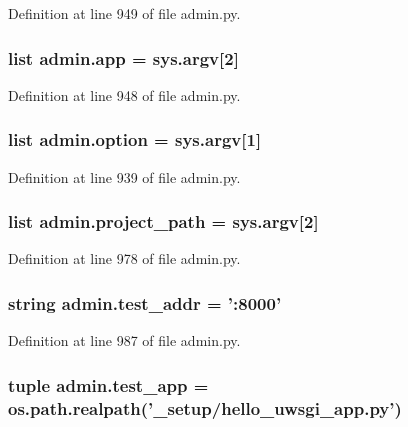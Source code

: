 Definition at line 949 of file admin.\-py.

\hypertarget{namespaceadmin_a88f927a5e67d8ccf759fd256f58a9411}{
\subsubsection[{app}]{\setlength{\rightskip}{0pt plus 5cm}list admin.\-app = sys.\-argv\mbox{[}2\mbox{]}}}\label{namespaceadmin_a88f927a5e67d8ccf759fd256f58a9411}


Definition at line 948 of file admin.\-py.

\hypertarget{namespaceadmin_a5ed72260a120fc91cfd491f424eeb883}{
\subsubsection[{option}]{\setlength{\rightskip}{0pt plus 5cm}list admin.\-option = sys.\-argv\mbox{[}1\mbox{]}}}\label{namespaceadmin_a5ed72260a120fc91cfd491f424eeb883}


Definition at line 939 of file admin.\-py.

\hypertarget{namespaceadmin_a311ce11d8285f485768151b9d757e478}{
\subsubsection[{project\-\_\-path}]{\setlength{\rightskip}{0pt plus 5cm}list admin.\-project\-\_\-path = sys.\-argv\mbox{[}2\mbox{]}}}\label{namespaceadmin_a311ce11d8285f485768151b9d757e478}


Definition at line 978 of file admin.\-py.

\hypertarget{namespaceadmin_a48db396eb86a22a960bba5ce65c12651}{
\subsubsection[{test\-\_\-addr}]{\setlength{\rightskip}{0pt plus 5cm}string admin.\-test\-\_\-addr = '\-:8000'}}\label{namespaceadmin_a48db396eb86a22a960bba5ce65c12651}


Definition at line 987 of file admin.\-py.

\hypertarget{namespaceadmin_a86733f8848ca96c56cf7c51370ebc7bd}{
\subsubsection[{test\-\_\-app}]{\setlength{\rightskip}{0pt plus 5cm}tuple admin.\-test\-\_\-app = os.\-path.\-realpath('{\bf \-\_\-setup}/hello\-\_\-uwsgi\-\_\-app.\-py')}}\label{namespaceadmin_a86733f8848ca96c56cf7c51370ebc7bd}


